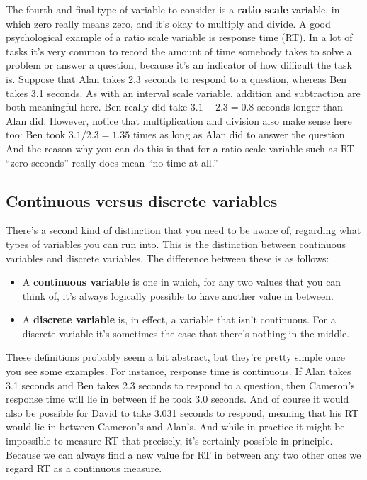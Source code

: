 \documentclass[
]{book}
\providecommand{\tightlist}{%
  \setlength{\itemsep}{0pt}\setlength{\parskip}{0pt}}
\begin{document}
The fourth and final type of variable to consider is a {\textbf{ratio scale}} variable, in which zero really means zero, and it's okay to multiply and divide. A good psychological example of a ratio scale variable is response time (RT). In a lot of tasks it's very common to record the amount of time somebody takes to solve a problem or answer a question, because it's an indicator of how difficult the task is. Suppose that Alan takes 2.3 seconds to respond to a question, whereas Ben takes 3.1 seconds. As with an interval scale variable, addition and subtraction are both meaningful here. Ben really did take \(3.1 - 2.3 = 0.8\) seconds longer than Alan did. However, notice that multiplication and division also make sense here too: Ben took \(3.1 / 2.3 = 1.35\) times as long as Alan did to answer the question. And the reason why you can do this is that for a ratio scale variable such as RT ``zero seconds'' really does mean ``no time at all.''

\hypertarget{continuousdiscrete}{%
\subsection{Continuous versus discrete variables}\label{continuousdiscrete}}

There's a second kind of distinction that you need to be aware of, regarding what types of variables you can run into. This is the distinction between continuous variables and discrete variables. The difference between these is as follows:

\begin{itemize}
\tightlist
\item
  A {\textbf{continuous variable}} is one in which, for any two values that you can think of, it's always logically possible to have another value in between.
\item
  A {\textbf{discrete variable}} is, in effect, a variable that isn't continuous. For a discrete variable it's sometimes the case that there's nothing in the middle.
\end{itemize}

These definitions probably seem a bit abstract, but they're pretty simple once you see some examples. For instance, response time is continuous. If Alan takes 3.1 seconds and Ben takes 2.3 seconds to respond to a question, then Cameron's response time will lie in between if he took 3.0 seconds. And of course it would also be possible for David to take 3.031 seconds to respond, meaning that his RT would lie in between Cameron's and Alan's. And while in practice it might be impossible to measure RT that precisely, it's certainly possible in principle. Because we can always find a new value for RT in between any two other ones we regard RT as a continuous measure.
\end{document}
